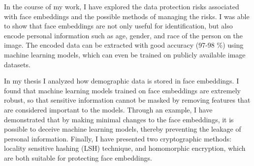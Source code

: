 In the course of my work, I have explored the data protection risks associated with face embeddings and the possible methods of managing the risks. I was able to show that face embeddings are not only useful for identification, but also encode personal information such as age, gender, and race of the person on the image. The encoded data can be extracted with good accuracy (97-98 \%) using machine learning models, which can even be trained on publicly available image datasets.

In my thesis I analyzed how demographic data is stored in face embeddings. I found that machine learning models trained on face embeddings are extremely robust, so that sensitive information cannot be masked by removing features that are considered important to the models. Through an example, I have demonstrated that by making minimal changes to the face embeddings, it is possible to deceive machine learning models, thereby preventing the leakage of personal information. Finally, I have presented two cryptographic methods: locality sensitive hashing (LSH) technique, and homomorphic encryption, which are both suitable for protecting face embeddings.

\vfill
\selectthesislanguage


